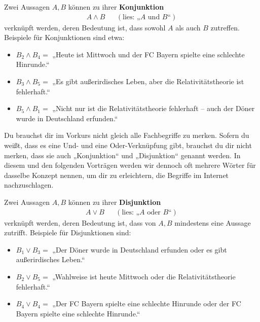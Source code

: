 	
	\begin{de}
            Zwei Aussagen $A,B$ können zu ihrer \textbf{Konjunktion}
\begin{align*}
  A\land B && (\text{lies: „$A$ und $B$“})
\end{align*}
 verknüpft werden, deren Bedeutung ist, dass sowohl $A$ als auch $B$ zutreffen. Beispiele für Konjunktionen sind etwa:
\begin{itemize}
    \item $B_2\land B_4 =$ „Heute ist Mittwoch und der FC Bayern spielte eine schlechte Hinrunde.“
\item $B_3\land B_5 =$ „Es gibt außerirdisches Leben, aber die Relativitätstheorie ist fehlerhaft.“
    \item $B_5\land B_1 =$ „Nicht nur ist die Relativitätstheorie fehlerhaft -- auch der Döner wurde in Deutschland erfunden.“
\end{itemize}
	\end{de}
	
	
	
\begin{bem}[Fachbegriffe]
 Du brauchst dir im Vorkurs nicht gleich alle Fachbegriffe zu merken. Sofern du weißt, dass es eine Und- und eine Oder-Verknüpfung gibt, brauchst du dir nicht merken, dass sie auch „Konjunktion“ und „Disjunktion“ genannt werden. In diesem und den folgenden Vorträgen werden wir dennoch oft mehrere Wörter für dasselbe Konzept nennen, um dir zu erleichtern, die Begriffe im Internet nachzuschlagen.
\end{bem}



	\begin{de}
Zwei Aussagen $A,B$ können zu ihrer \textbf{Disjunktion}
\begin{align*}
  A\lor B && (\text{lies: „$A$ oder $B$“})
\end{align*}
verknüpft werden, deren Bedeutung ist, dass von $A, B$ mindestens eine Aussage zutrifft. Beispiele für Disjunktionen sind:
\begin{itemize}
    \item $B_1 \lor B_3 =$ „Der Döner wurde in Deutschland erfunden oder es gibt außerirdisches Leben.“
\item $B_2\lor B_5 =$ „Wahlweise ist heute Mittwoch oder die Relativitätstheorie fehlerhaft.“
\item $B_4\lor B_4=$ „Der FC Bayern spielte eine schlechte Hinrunde oder der FC Bayern spielte eine schlechte Hinrunde.“
\end{itemize}
	\end{de}


